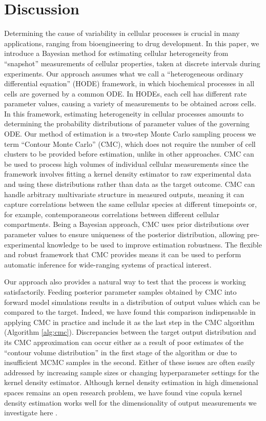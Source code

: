 \section{Discussion}
\label{sec:discussion}
Determining the cause of variability in cellular processes is crucial in many applications, ranging from bioengineering to drug development. In this paper, we introduce a Bayesian method for estimating cellular heterogeneity from ``snapshot'' measurements of cellular properties, taken at discrete intervals during experiments. Our approach assumes what we call a ``heterogeneous ordinary differential equation'' (HODE) framework, in which biochemical processes in all cells are governed by a common ODE. In HODEs, each cell has different rate parameter values, causing a variety of measurements to be obtained across cells. In this framework, estimating heterogeneity in cellular processes amounts to determining the probability distributions of parameter values of the governing ODE. Our method of estimation is a two-step Monte Carlo sampling process we term ``Contour Monte Carlo'' (CMC), which does not require the number of cell clusters to be provided before estimation, unlike in other approaches. CMC can be used to process high volumes of individual cellular measurements since the framework involves fitting a kernel density estimator to raw experimental data and using these distributions rather than data as the target outcome. CMC can handle arbitrary multivariate structure in measured outputs, meaning it can capture correlations between the same cellular species at different timepoints or, for example, contemporaneous correlations between different cellular compartments. Being a Bayesian approach, CMC uses prior distributions over parameter values to ensure uniqueness of the posterior distribution, allowing pre-experimental knowledge to be used to improve estimation robustness. The flexible and robust framework that CMC provides means it can be used to perform automatic inference for wide-ranging systems of practical interest.

Our approach also provides a natural way to test that the process is working satisfactorily. Feeding posterior parameter samples obtained by CMC into forward model simulations results in a distribution of output values which can be compared to the target. Indeed, we have found this comparison indispensable in applying CMC in practice and include it as the last step in the CMC algorithm (Algorithm \ref{alg:cmc}). Discrepancies between the target output distribution and its CMC approximation can occur either as a result of poor estimates of the ``contour volume distribution'' in the first stage of the algorithm or due to insufficient MCMC samples in the second. Either of these issues are often easily addressed by increasing sample sizes or changing hyperparameter settings for the kernel density estimator. Although kernel density estimation in high dimensional spaces remains an open research problem, we have found vine copula kernel density estimation works well for the dimensionality of output measurements we investigate here \cite{nagler2016evading}.

